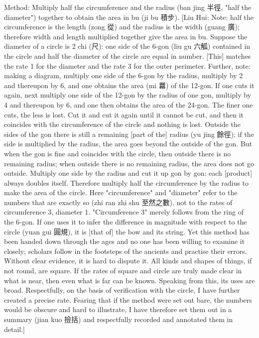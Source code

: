 \documentclass[11pt]{article}
\newenvironment{uniten}{\par\small\color{black!85}}{\par\medskip}
\begin{document}
\begin{uniten}Method: Multiply half the circumference and the radius (ban jing 半徑, "half the diameter") together to obtain the area in bu (ji bu 積步). [Liu Hui: Note: half the circumference is the length (zong 從) and the radius is the width (guang 廣); therefore width and length multiplied together give the area in bu. Suppose the diameter of a circle is 2 chi (尺): one side of the 6-gon (liu gu 六觚) contained in the circle and half the diameter of the circle are equal in number. [This] matches the rate 1 for the diameter and the rate 3 for the outer perimeter. Further, note: making a diagram, multiply one side of the 6-gon by the radius, multiply by 2 and thereupon by 6, and one obtains the area (mi 羃) of the 12-gon. If one cuts it again, next multiply one side of the 12-gon by the radius of one gon, multiply by 4 and thereupon by 6, and one then obtains the area of the 24-gon. The finer one cuts, the less is lost. Cut it and cut it again until it cannot be cut, and then it coincides with the circumference of the circle and nothing is lost. Outside the sides of the gon there is still a remaining [part of the] radius (yu jing 餘徑); if the side is multiplied by the radius, the area goes beyond the outside of the gon. But when the gon is fine and coincides with the circle, then outside there is no remaining radius; when outside there is no remaining radius, the area does not go outside. Multiply one side by the radius and cut it up gon by gon: each [product] always doubles itself. Therefore multiply half the circumference by the radius to make the area of the circle. Here "circumference" and "diameter" refer to the numbers that are exactly so (zhi ran zhi shu 至然之數), not to the rates of circumference 3, diameter 1. "Circumference 3" merely follows from the ring of the 6-gon. If one uses it to infer the difference in magnitude with respect to the circle (yuan gui 圓規), it is [that of] the bow and its string. Yet this method has been handed down through the ages and no one has been willing to examine it closely; scholars follow in the footsteps of the ancients and practise their errors. Without clear evidence, it is hard to dispute it. All kinds and shapes of things, if not round, are square. If the rates of square and circle are truly made clear in what is near, then even what is far can be known. Speaking from this, its uses are broad. Respectfully, on the basis of verification with the circle, I have further created a precise rate. Fearing that if the method were set out bare, the numbers would be obscure and hard to illustrate, I have therefore set them out in a summary (jian kuo 撿括) and respectfully recorded and annotated them in detail.]\end{uniten}
\end{document}
